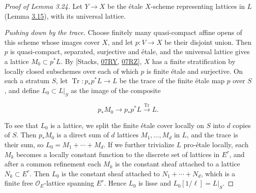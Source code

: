 \documentclass[11pt]{article}
\begin{document}
\begin{proof}[{Proof of Lemma 3.24}]\label{bp79}%
Let \(Y\to X\) be the étale \(X\)-scheme representing lattices in \(L\) (Lemma \hyperref[bp48]{3.15}), with its universal lattice.

\emph{Pushing down by the trace.} Choose finitely many quasi-compact affine opens of this scheme whose images cover \(X\), and let \(p:V\to X\) be their disjoint union. Then \(p\) is quasi-compact, separated, surjective and étale, and the universal lattice gives a lattice \(M_0\subset p^*L\). By [Stacks, \href{https://stacks.math.columbia.edu/tag/07RY}{07RY}, \href{https://stacks.math.columbia.edu/tag/07RZ}{07RZ}], \(X\) has a finite stratification by locally closed subschemes over each of which \(p\) is finite étale and surjective. On such a stratum \(S\), let \(\operatorname{Tr}:p_*p^*L\to L\) be the trace of the finite étale map \(p\) over \(S\), and define \(L_0\subset L|_S\) as the image of the composite

\[
p_*M_0\longrightarrow p_*p^*L\xrightarrow{\operatorname{Tr}}L.
\]

To see that \(L_0\) is a lattice, we split the finite étale cover locally on \(S\) into \(d\) copies of \(S\). Then \(p_*M_0\) is a direct sum of \(d\) lattices \(M_1,\dots,M_d\) in \(L\), and the trace is their sum, so \(L_0=M_1+\cdots+M_d\). If we further trivialize \(L\) pro-étale locally, each \(M_k\) becomes a locally constant function to the discrete set of lattices in \(E^r\), and after a common refinement each \(M_k\) is the constant sheaf attached to a lattice \(N_k\subset E^r\). Then \(L_0\) is the constant sheaf attached to \(N_1+\cdots+N_d\), which is a finite free \(\mathcal O_E\)-lattice spanning \(E^r\). Hence \(L_0\) is lisse and \(L_0[1/\ell]=L|_S\).
\end{proof}


\end{document}
